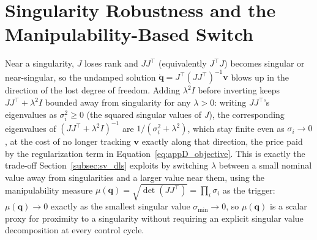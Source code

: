 \section{Singularity Robustness and the Manipulability-Based Switch}\label{sec:appD_singularity}

Near a singularity, $J$ loses rank and $JJ^\top$ (equivalently $J^\top J$) becomes singular or
near-singular, so the undamped solution $\dot{\mathbf{q}} = J^\top(JJ^\top)^{-1}\mathbf{v}$ blows up
in the direction of the lost degree of freedom. Adding $\lambda^2I$ before inverting keeps
$JJ^\top+\lambda^2I$ bounded away from singularity for any $\lambda>0$: writing $JJ^\top$'s
eigenvalues as $\sigma_i^2 \geq 0$ (the squared singular values of $J$), the corresponding
eigenvalues of $(JJ^\top+\lambda^2I)^{-1}$ are $1/(\sigma_i^2+\lambda^2)$, which stay finite even as
$\sigma_i \to 0$, at the cost of no longer tracking $\mathbf{v}$ exactly along that direction, the
price paid by the regularization term in Equation~\eqref{eq:appD_objective}. This is exactly the
trade-off Section~\ref{subsec:sv_dls} exploits by switching $\lambda$ between a small nominal value
away from singularities and a larger value near them, using the manipulability measure
$\mu(\mathbf{q}) = \sqrt{\det(JJ^\top)} = \prod_i \sigma_i$ as the trigger: $\mu(\mathbf{q}) \to 0$
exactly as the smallest singular value $\sigma_{\min} \to 0$, so $\mu(\mathbf{q})$ is a scalar proxy
for proximity to a singularity without requiring an explicit singular value decomposition at every
control cycle.



